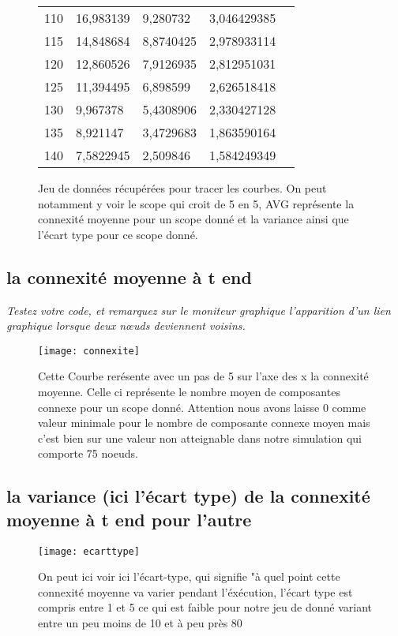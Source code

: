 \documentclass[11pt,a4paper,sans]{report}
\begin{document}
\begin{figure}[H]
\begin{tabular}{lllll}
			110 & 16,983139 & 9,280732  & 3,046429385 &  \\
			115 & 14,848684 & 8,8740425 & 2,978933114 &  \\
			120 & 12,860526 & 7,9126935 & 2,812951031 &  \\
			125 & 11,394495 & 6,898599  & 2,626518418 &  \\
			130 & 9,967378  & 5,4308906 & 2,330427128 &  \\
			135 & 8,921147  & 3,4729683 & 1,863590164 &  \\
			140 & 7,5822945 & 2,509846  & 1,584249349 & 
		\end{tabular}
		\caption{Jeu de données récupérées pour tracer les courbes. On peut notamment y voir le scope qui croit de 5 en 5, AVG représente la connexité moyenne pour un scope donné et la variance ainsi que l'écart type pour ce scope donné.}
	\end{figure}

	\subsection{la connexité moyenne à t end}
	\par\textit{Testez votre code, et remarquez sur le moniteur graphique l’apparition d’un lien graphique lorsque deux nœuds deviennent voisins.}
	\begin{figure}[H]
		\centering
		\texttt{[image: connexite]}
		\caption{Cette Courbe rerésente avec un pas de 5 sur l'axe des x la connexité moyenne. Celle ci représente le nombre moyen de composantes connexe pour un scope donné. Attention nous avons laisse 0 comme valeur minimale pour le nombre de composante connexe moyen mais c'est bien sur une valeur non atteignable dans notre simulation qui comporte 75 noeuds.}
	\end{figure}


	\subsection{la variance (ici l'écart type) de la connexité moyenne à t end pour l’autre}
	\begin{figure}[H]
		\centering
		\texttt{[image: ecarttype]}
		\caption{On peut ici voir ici l'écart-type, qui signifie "à quel point cette connexité moyenne va varier pendant l'éxécution, l'écart type est compris entre 1 et 5 ce qui est faible pour notre jeu de donné variant entre un peu moins de 10 et à peu près 80 }
	\end{figure}
\end{document}
